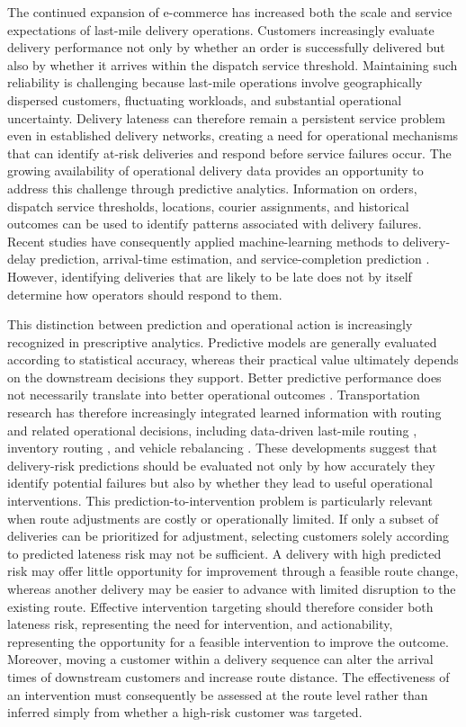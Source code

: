 \documentclass[11pt,a4paper]{article}
\begin{document}
The continued expansion of e-commerce has increased both the scale and
service expectations of last-mile delivery operations. Customers
increasingly evaluate delivery performance not only by whether an order
is successfully delivered but also by whether it arrives within the
dispatch service threshold. Maintaining such reliability is challenging because
last-mile operations involve geographically dispersed customers,
fluctuating workloads, and substantial operational uncertainty. Delivery
lateness can therefore remain a persistent service problem even in
established delivery networks, creating a need for operational
mechanisms that can identify at-risk deliveries and respond before
service failures occur. The growing availability of operational delivery
data provides an opportunity to address this challenge through
predictive analytics. Information on orders, dispatch service thresholds,
locations, courier assignments, and historical outcomes can be used to
identify patterns associated with delivery failures. Recent studies have
consequently applied machine-learning methods to delivery-delay
prediction, arrival-time estimation, and service-completion prediction
\cite{pegado2023,zhang2024,muller2025}.
However, identifying deliveries that are likely to be late does not by
itself determine how operators should respond to them.

This distinction between prediction and operational action is
increasingly recognized in prescriptive analytics. Predictive models are
generally evaluated according to statistical accuracy, whereas their
practical value ultimately depends on the downstream decisions they
support. Better predictive performance does not necessarily translate
into better operational outcomes \cite{elmachtoub2022,yan2022,wang2023}.
Transportation research has therefore
increasingly integrated learned information with routing and related
operational decisions, including data-driven last-mile routing
\cite{dieter2023,ghosh2023,ozarik2024}, inventory routing
\cite{jia2025}, and vehicle rebalancing \cite{guo2026}.
These developments suggest that delivery-risk predictions should be
evaluated not only by how accurately they identify potential failures
but also by whether they lead to useful operational interventions. This
prediction-to-intervention problem is particularly relevant when route
adjustments are costly or operationally limited. If only a subset of
deliveries can be prioritized for adjustment, selecting customers solely
according to predicted lateness risk may not be sufficient. A delivery
with high predicted risk may offer little opportunity for improvement
through a feasible route change, whereas another delivery may be easier
to advance with limited disruption to the existing route. Effective
intervention targeting should therefore consider both lateness risk,
representing the need for intervention, and actionability, representing
the opportunity for a feasible intervention to improve the outcome.
Moreover, moving a customer within a delivery sequence can alter the
arrival times of downstream customers and increase route distance. The
effectiveness of an intervention must consequently be assessed at the
route level rather than inferred simply from whether a high-risk
customer was targeted.
\end{document}
